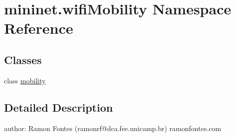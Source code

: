 \hypertarget{namespacemininet_1_1wifiMobility}{\section{mininet.\-wifi\-Mobility Namespace Reference}
\label{namespacemininet_1_1wifiMobility}
}
\subsection*{Classes}
\begin{DoxyCompactItemize}
\item 
class \hyperlink{classmininet_1_1wifiMobility_1_1mobility}{mobility}
\end{DoxyCompactItemize}


\subsection{Detailed Description}
\begin{DoxyVerb}author: Ramon Fontes (ramonrf@dca.fee.unicamp.br)
        ramonfontes.com\end{DoxyVerb}
 